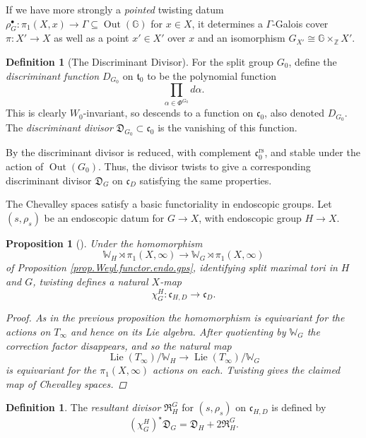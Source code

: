 \documentclass[openany]{amsbook}
\newtheorem{proposition}[theorem]{Proposition}
\theoremstyle{definition}
\newtheorem{definition}[theorem]{Definition}
\theoremstyle{remark}
\numberwithin{equation}{section}
\newcommand{\Z}{\mathbb{Z}}
\newcommand{\G}{\mathbb{G}}
\newcommand{\W}{\mathbb{W}}
\renewcommand{\-}{\operatorname{-}}
\newcommand{\Out}{\operatorname{Out}}
\newcommand{\on}[1]{\operatorname{#1}}
\newcommand{\rs}{\on{rs}}
\newcommand{\ft}{\mathfrak{t}}
\newcommand{\fc}{\mathfrak{c}}
\newcommand{\fD}{\mathfrak{D}}
\newcommand{\fR}{\mathfrak{R}}
\newcommand{\Lie}{\on{Lie}}
\begin{document}
If we have more strongly a \textit{pointed} twisting datum $\rho_G^\bullet : \pi_1(X, x) \to \Gamma \subseteq \Out(\G)$ for $x \in X$, it determines a $\Gamma$-Galois cover $\pi : X' \to X$ as well as a point $x' \in X'$ over $x$ and an isomorphism $G_{X'} \cong \G \times_{\Z} X'$.

\begin{definition}[The Discriminant Divisor]\label{def.discr.divisor}
    For the split group $G_0$, define the \emph{discriminant function} $D_{G_0}$ on $\ft_0$ to be the polynomial function
    $$
        \prod_{\alpha \in \Phi^{G_0}} d \alpha.
    $$
    This is clearly $W_0$-invariant, so descends to a function on $\fc_0$, also denoted $D_{G_0}$. The \emph{discriminant divisor} $\fD_{G_0} \subset \fc_0$ is the vanishing of this function.
\end{definition}
By \cite[Lemme 1.10.1]{ngofl} the discriminant divisor is reduced, with complement $\fc_0^{\rs}$, and stable under the action of $\Out(G_0)$. Thus, the divisor twists to give a corresponding discriminant divisor $\fD_G$ on $\fc_D$ satisfying the same properties.

The Chevalley spaces satisfy a basic functoriality in endoscopic groups. Let $(s, \rho_s)$ be an endoscopic datum for $G \to X$, with endoscopic group $H \to X$. 

\begin{proposition}[{\cite[\S 1.9, 1.10]{ngofl}}]\label{prop.chevalley.functor.endo.gps}
    Under the homomorphism $$\W_H \rtimes \pi_1(X, \infty) \to \W_G \rtimes \pi_1(X, \infty)$$ of Proposition \ref{prop.Weyl.functor.endo.gps}, identifying split maximal tori in $H$ and $G$, twisting defines a natural $X$-map
    $$
        \chi^H_G : \fc_{H, D} \to \fc_{D}.
    $$
    \begin{proof}
        As in the previous proposition the homomorphism is equivariant for the actions on $T_\infty$ and hence on its Lie algebra. After quotienting by $\W_G$ the correction factor disappears, and so the natural map
        $$
            \Lie(T_\infty)/\W_H \to \Lie(T_\infty)/\W_G
        $$
        is equivariant for the $\pi_1(X, \infty)$ actions on each. Twisting gives the claimed map of Chevalley spaces.
    \end{proof}
\end{proposition}

\begin{definition}\label{def.resultant.divisor}
    The \emph{resultant divisor} $\fR_H^G$ for $(s, \rho_s)$ on $\fc_{H,D}$ is defined by 
    $$
        (\chi^H_G)^\star \fD_G = \fD_H + 2\fR_H^G.
    $$
\end{definition}
\end{document}
